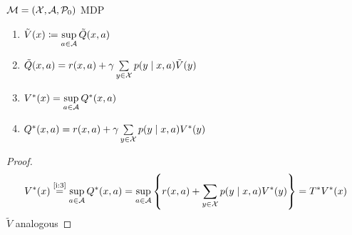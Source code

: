 \documentclass[fleqn, 11pt, a4paper]{book}
\begin{document}
\frontmatter
\titelpage

\cleardoublepage

\setcounter{tocdepth}{1}
\tableofcontents

\mainmatter
\begin{lemma}\label{V*,Q* relation}\(\mathcal{M}=(\mathcal{X},\mathcal{A},\mathcal{P}_0)\) MDP
	\begin{enumerate}[label={(\roman*)},font=\normalfont]
		\item \(\tilde{V}(x)\coloneqq\sup\limits_{a\in\mathcal{A}} \tilde{Q}(x,a)\)
		\item \( \tilde{Q}(x,a) = r(x,a)+\gamma\sum\limits_{y\in\mathcal{X}}p(y\mid x,a)\tilde{V}(y) \)
		\item\label{i:3} \(V^*(x)=\sup\limits_{a\in\mathcal{A}}Q^*(x,a)\)
		\item\label{i:4} \(Q^*(x,a)=r(x,a)+\gamma \sum\limits_{y\in\mathcal{X}}p(y\mid x,a) V^*(y)\)
	\end{enumerate}
\end{lemma}
\begin{proof}
	\begin{align*}
	V^*(x)\stackrel{\text{\ref{i:3}}}{=}\sup_{a\in\mathcal{A}}Q^*(x,a)=\sup_{a\in\mathcal{A}}\left\{r(x,a)+\sum_{y\in\mathcal{X}}p(y\mid x,a) V^*(y)\right\} =T^*V^*(x)
	\end{align*}
	\(\tilde{V}\) analogous
\end{proof}




\begin{appendix}

\end{appendix}
\backmatter
\begin{thebibliography}{99}
%
\end{thebibliography}
\end{document}
